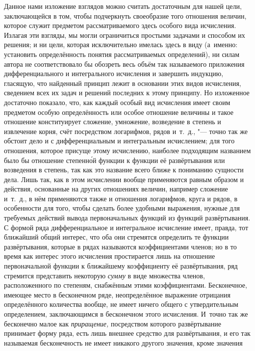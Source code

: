 Данное нами изложение взглядов можно считать достаточным для нашей цели,
заключающейся в том, чтобы подчеркнуть своеобразие того отношения величин,
которое служит предметом рассматриваемого здесь особого вида исчисления.
Излагая эти взгляды, мы могли ограничиться простыми задачами и способом их
решения; и ни цели, которая исключительно имелась здесь в виду (а~именно:
установить определённость понятия рассматриваемых определений), ни силам автора
не соответствовало бы обозреть весь объём так называемого приложения
дифференциального и интегрального исчисления и завершить индукцию, гласящую,
что найденный принцип лежит в основании этих видов исчисления, сведением всех
их задач и решений последних к этому принципу. Но изложенное достаточно
показало, что, как каждый особый вид исчисления имеет своим предметом особую
определённость или особое отношение величины и такое отношение конституирует
сложение, умножение, возведение в степень и извлечение корня, счёт посредством
логарифмов, рядов и~т.~д., "--- точно так же обстоит дело и с дифференциальным
и интегральным исчислением; для того отношения, которое присуще этому
исчислению, наиболее подходящим названием было бы отношение степенн\'{о}й
функции к функции её развёртывания или возведения в степень, так как это
название всего ближе к пониманию сущности дела. Лишь так, как в этом исчислении
вообще применяются равным образом и действия, основанные на других отношениях
величин, например сложение и~т.~д., в нём применяются также и отношения
логарифмов, круга и рядов, в особенности для того, чтобы сделать более удобными
выражения, нужные для требуемых действий вывода первоначальных функций из
функций развёртывания. С формой ряда дифференциальное и интегральное исчисление
имеет, правда, тот ближайший общий интерес, что оба они стремятся определить те
функции развёртывания, которые в рядах называются коэффициентами членов; но в
то время как интерес этого исчисления простирается лишь на отношение
первоначальной функции к ближайшему коэффициенту её развёртывания, ряд
стремится представить некоторую {\em сумму} в виде множества членов,
расположенного по степеням, снабжённым этими коэффициентами. Бесконечное,
имеющее место в бесконечном ряде, неопределённое выражение отрицания
определённого количества вообще, не имеет ничего общего с утвердительным
определением, заключающимся в бесконечном этого исчисления. И~точно так же
бесконечно малое как {\em приращение,} посредством которого развёртывание
принимает форму ряда, есть лишь внешнее средство для развёртывания, и его так
называемая бесконечность не имеет никакого другого значения, кроме значения
